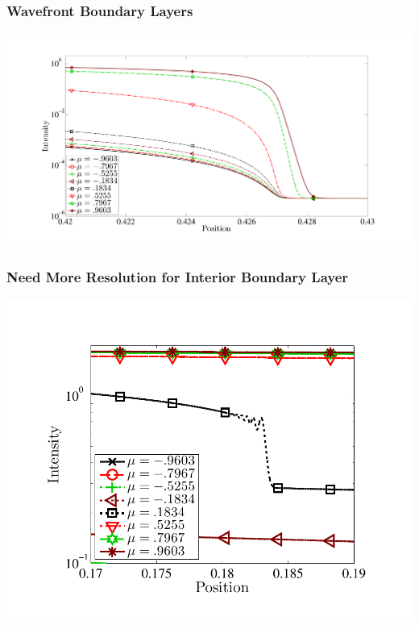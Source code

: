 \documentclass{beamer}
\begin{document}
\begin{frame}
\frametitle{Wavefront Boundary Layers}
\centering
\includegraphics[width=1.05\textwidth,trim=1.75in  0.2in 1in 0.75in,clip=true]{../chapter6_grey_radtran/Dissertation_Data/S8_thermal_wavefront_boundary_layer.pdf}
\end{frame}

\begin{frame}
\frametitle{Need More Resolution for Interior Boundary Layer}
\centering
\includegraphics[height=0.8\textheight,trim=0.5in  0.2in 0.75in 0.5in,clip=true]{../chapter6_grey_radtran/Dissertation_Data/S8_pos_mu_glance_boundary_layer_log.pdf}
\end{frame}
\end{document}
